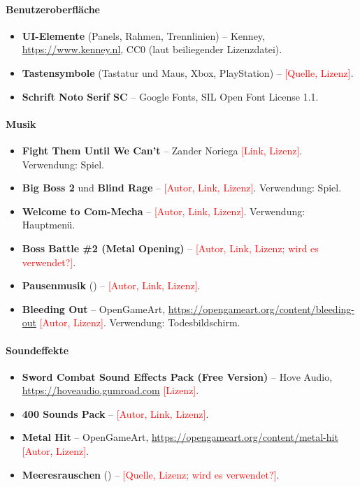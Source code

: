 \documentclass[../Main.tex]{subfiles}
\begin{document}
\paragraph{Benutzeroberfläche}
\begin{itemize}[leftmargin=1.5cm]
    \item \textbf{UI-Elemente} (Panels, Rahmen, Trennlinien) -- Kenney, \url{https://www.kenney.nl}, CC0 (laut beiliegender Lizenzdatei).
    \item \textbf{Tastensymbole} (Tastatur und Maus, Xbox, PlayStation) -- \textcolor{red}{[Quelle, Lizenz]}.
    \item \textbf{Schrift Noto Serif SC} -- Google Fonts, SIL Open Font License 1.1.
\end{itemize}

\paragraph{Musik}
\begin{itemize}[leftmargin=1.5cm]
    \item \textbf{Fight Them Until We Can't} -- Zander Noriega \textcolor{red}{[Link, Lizenz]}. Verwendung: Spiel.
    \item \textbf{Big Boss 2} und \textbf{Blind Rage} -- \textcolor{red}{[Autor, Link, Lizenz]}. Verwendung: Spiel.
    \item \textbf{Welcome to Com-Mecha} -- \textcolor{red}{[Autor, Link, Lizenz]}. Verwendung: Hauptmenü.
    \item \textbf{Boss Battle \#2 (Metal Opening)} -- \textcolor{red}{[Autor, Link, Lizenz; wird es verwendet?]}.
    \item \textbf{Pausenmusik} () -- \textcolor{red}{[Autor, Link, Lizenz]}.
    \item \textbf{Bleeding Out} -- OpenGameArt, \url{https://opengameart.org/content/bleeding-out} \textcolor{red}{[Autor, Lizenz]}. Verwendung: Todesbildschirm.
\end{itemize}

\paragraph{Soundeffekte}
\begin{itemize}[leftmargin=1.5cm]
    \item \textbf{Sword Combat Sound Effects Pack (Free Version)} -- Hove Audio, \url{https://hoveaudio.gumroad.com} \textcolor{red}{[Lizenz]}.
    \item \textbf{400 Sounds Pack} -- \textcolor{red}{[Autor, Link, Lizenz]}.
    \item \textbf{Metal Hit} -- OpenGameArt, \url{https://opengameart.org/content/metal-hit} \textcolor{red}{[Autor, Lizenz]}.
    \item \textbf{Meeresrauschen} () -- \textcolor{red}{[Quelle, Lizenz; wird es verwendet?]}.
\end{itemize}
\end{document}
